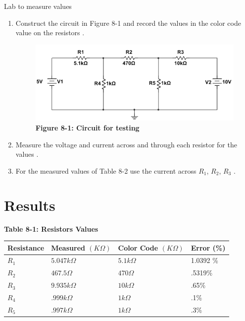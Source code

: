 \documentclass[a4paper]{article}
\begin{document}
Lab to measure values\\
\begin{enumerate}
    \item Construct the circuit in Figure 8-1 and record the values in the color code value on the resistors \cite{UNCC-ECE-Dept:2023}.
    \begin{figure}[H]\label{fig8-1}
        \begin{center}
            \includegraphics{fig8-1}\\
            \small\textbf{Figure 8-1: Circuit for testing \cite{UNCC-ECE-Dept:2023}}
        \end{center}
    \end{figure}
    \item Measure the voltage and current across and through each resistor for the values \cite{UNCC-ECE-Dept:2023}.
    \item For the measured values of Table 8-2 use the current across $R_{1}$, $R_{2}$, $R_{3}$ \cite{UNCC-ECE-Dept:2023}.   
\end{enumerate}
\section{Results}

\begin{center}
    \small\textbf{Table 8-1: Resistors Values \cite{UNCC-ECE-Dept:2023}}
    \begin{tabular}{|p{3 cm}|p{3cm}|p{3 cm}|p{3 cm}|}
        \hline
        Resistance & Measured $(K\Omega)$ & Color Code $(K\Omega)$ & Error (\%) \\
        \hline
        $R_{1}$ & $5.047 k\Omega$ & $5.1k\Omega$ & 1.0392 \% \\
        \hline
        $R_{2}$ & $467.5 \Omega$ & $470\Omega$& .5319\% \\
        \hline
        $R_{3}$ & $9.935 k\Omega$ & $10 k\Omega$& .65\% \\
        \hline
        $R_{4}$ & $.999 k\Omega$ & $1 k\Omega$& .1\% \\
        \hline
        $R_{5}$ & $.997 k\Omega$ & $1 k\Omega$ & .3\% \\
        \hline
    \end{tabular}
\end{center}
\end{document}
